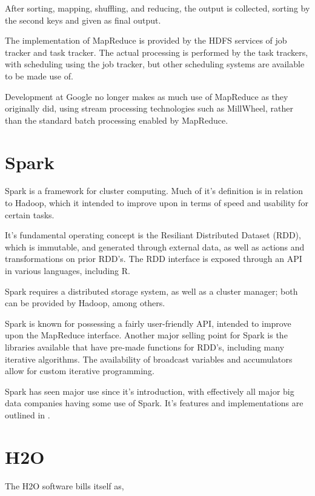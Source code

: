 \documentclass[10pt,a4paper]{article}
\begin{document}
After sorting, mapping, shuffling, and reducing, the output is
collected, sorting by the second keys and given as final output.

The implementation of MapReduce is provided by the HDFS services of
job tracker and task tracker. The actual processing is performed by
the task trackers, with scheduling using the job tracker, but other
scheduling systems are available to be made use of.

Development at Google no longer makes as much use of MapReduce as they
originally did, using stream processing technologies such as
MillWheel, rather than the standard batch processing enabled by
MapReduce\cite{akidau2013millwheel}.

\section{Spark}
\label{sec:spark}

Spark is a framework for cluster computing\cite{zaharia2010spark}. Much of it's definition is
in relation to Hadoop, which it intended to improve upon in terms of
speed and usability for certain tasks.

It's fundamental operating concept is the Resiliant Distributed
Dataset (RDD), which is immutable, and generated through external
data, as well as actions and transformations on prior RDD's. The RDD
interface is exposed through an API in various languages, including R.

Spark requires a distributed storage system, as well as a cluster
manager; both can be provided by Hadoop, among others.

Spark is known for possessing a fairly user-friendly API, intended to
improve upon the MapReduce interface. Another major selling point for
Spark is the libraries available that have pre-made functions for
RDD's, including many iterative algorithms. The availability of
broadcast variables and accumulators allow for custom iterative
programming.

Spark has seen major use since it's introduction, with effectively all
major big data companies having some use of Spark. It's features and
implementations are outlined in \textcite{zaharia2016apache}.
 

\section{H2O}
\label{sec:h2o}

The H2O software bills itself as,
\end{document}
